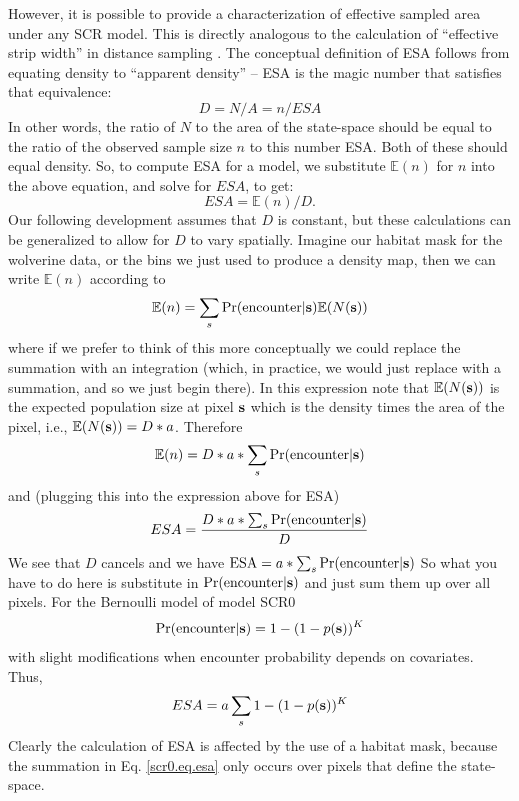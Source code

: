 {However, it is possible to provide a characterization of effective
sampled area under any SCR model.  This is directly analogous to the
calculation of ``effective strip width'' in distance sampling
\citep{buckland_etal:2001, borchers_etal:2002}.  The conceptual
definition of ESA follows from equating density to ``apparent
density'' -- ESA is the magic number that satisfies that equivalence:
\[
 D = N/A   = n/ESA
\]
In other words, the ratio of $N$ to the area of the state-space should be
equal to the ratio of the observed sample size $n$ to this
number
ESA. Both of these should equal density.
So, to compute ESA for a model, we  substitute $\mathbb{E}(n)$ for $n$
into the above equation, and solve for $ESA$, to get:
\[
 ESA = \mathbb{E}(n)/D.
\]
Our following development assumes that $D$ is constant, but these
calculations can be generalized to allow for $D$ to vary spatially.
Imagine our habitat mask for the wolverine data, or the bins we just
used to produce a density map, then we can write $\mathbb{E}(n)$
according to
\[
\mathbb{E}(n) = \sum_{s}  \Pr(\mbox{encounter} | {\bf s}) \mathbb{E}(N({\bf s}) )
\]
where if we prefer to think of this more conceptually we could replace
the summation with an integration (which, in practice, we would just
replace with a summation, and so we just begin there).
In this expression note that
$\mathbb{E}(N({\bf s}))$ is the expected population size at pixel
${\bf s}$  which is the
density times the area of the pixel, i.e., $\mathbb{E}(N({\bf s}))=
D*a$.
Therefore
\[
 \mathbb{E}(n) = D*a* \sum_{s} \Pr(\mbox{encounter} | {\bf s})
\]
and (plugging this into the expression above for ESA)
\[
 ESA = \frac{D*a*\sum_{s} \Pr(\mbox{encounter} | {\bf s}) }{D}
\]
We see that $D$ cancels and we have
$\mbox{ESA} = a*\sum_{s} \Pr(\mbox{encounter} | {\bf s})$
So what you have to do here is substitute in $\Pr(\mbox{encounter}|
{\bf s})$ and just sum them up over all pixels.  For the Bernoulli
model of model SCR0
\[
\Pr(\mbox{encounter}|{\bf s}) =    1-(1-p({\bf s}))^{K}
\]
with slight modifications when encounter probability depends on
covariates. Thus,
\begin{equation}
ESA = a  \sum_{s}   1-(1-p({\bf s}))^{K}
\label{scr0.eq.esa}
\end{equation}
Clearly the calculation of ESA is affected by the use of a
habitat mask, because the summation in Eq. \ref{scr0.eq.esa} only occurs over pixels
that define the state-space.

}
